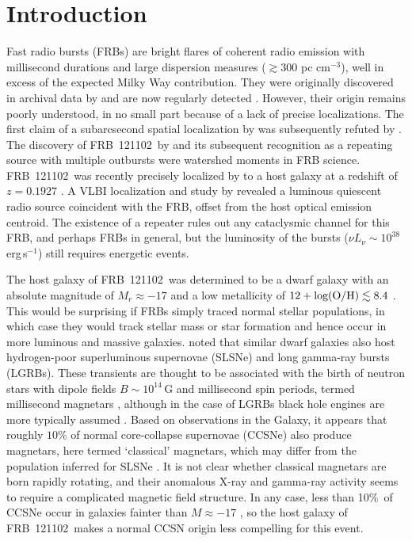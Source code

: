 \documentclass[twocolumn]{aastex6}
\newcommand{\repeater}{FRB~121102}
\begin{document}


\section{Introduction}

Fast radio bursts (FRBs) are bright flares of coherent radio emission with millisecond durations and large dispersion measures ($\gtrsim 300$ pc cm$^{-3}$), well in excess of the expected Milky Way contribution. They were originally discovered in archival data by \citet{lbm+.2007} and are now regularly detected \citep{Keane+12, Thornton+13, Spitler+14, Ravi+15, Petroff+16, Champion+16}.  However, their origin remains poorly understood, in no small part because of a lack of precise localizations. The first claim of a subarcsecond spatial localization by \citet{kjb+.2016} was subsequently refuted by \citet{wb.2016}. The discovery of \repeater\ by \citet{sch+.2014} and its subsequent recognition as a repeating source with multiple outbursts \citep{ssh+.2016} were watershed moments in FRB science. \repeater\ was recently precisely localized by \citet{clw+.2017} to a host galaxy at a redshift of $z=0.1927$ \citep{tbc+.2017}. A VLBI localization and study by \citet{mph+.2017} revealed a luminous quiescent radio source coincident with the FRB, offset from the host optical emission centroid. The existence of a repeater rules out any cataclysmic channel for this FRB, and perhaps FRBs in general, but the luminosity of the bursts ($\nu L_\nu \sim 10^{38}$\,erg\,s$^{-1}$) still requires energetic events.

The host galaxy of \repeater\ was determined to be a dwarf galaxy with an absolute magnitude of $M_r\approx -17$ and a low metallicity of $12+{\rm log(O/H)}\lesssim 8.4$ \citep{tbc+.2017}. This would be surprising if FRBs simply traced normal stellar populations, in which case they would track stellar mass or star formation and hence occur in more luminous and massive galaxies. \citet{tbc+.2017} noted that similar dwarf galaxies also host hydrogen-poor superluminous supernovae (SLSNe) and long gamma-ray bursts (LGRBs). These transients are thought to be associated with the birth of neutron stars with dipole fields $B\sim 10^{14}$\,G and millisecond spin periods, termed millisecond magnetars \citep[e.g.][]{kas2010,met2015,nic2017b}, although in the case of LGRBs black hole engines are more typically assumed \citep{woo1993,macf1999}. Based on observations in the Galaxy, it appears that roughly $10\%$ of normal core-collapse supernovae (CCSNe) also produce magnetars, here termed `classical' magnetars, which may differ from the population inferred for SLSNe \citep{kou1998,gill2007}. It is not clear whether classical magnetars are born rapidly rotating, and their anomalous X-ray and gamma-ray activity seems to require a complicated magnetic field structure. In any case, less than 10\%\ of CCSNe occur in galaxies fainter than $M\approx -17$ \citep{sve2010}, so the host galaxy of \repeater\ makes a normal CCSN origin less compelling for this event.
\end{document}
